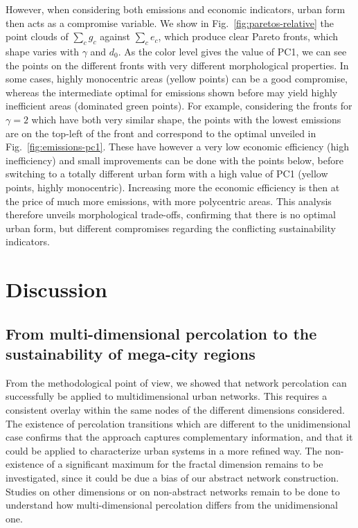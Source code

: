 \documentclass{jimis-en}
\begin{document}
However, when considering both emissions and economic indicators, urban form then acts as a compromise variable. We show in Fig.~\ref{fig:paretos-relative} the point clouds of $\sum_c g_c$ against $\sum_c e_c$, which produce clear Pareto fronts, which shape varies with $\gamma$ and $d_0$. As the color level gives the value of PC1, we can see the points on the different fronts with very different morphological properties. In some cases, highly monocentric areas (yellow points) can be a good compromise, whereas the intermediate optimal for emissions shown before may yield highly inefficient areas (dominated green points). For example, considering the fronts for $\gamma = 2$ which have both very similar shape, the points with the lowest emissions are on the top-left of the front and correspond to the optimal unveiled in Fig.~\ref{fig:emissions-pc1}. These have however a very low economic efficiency (high inefficiency) and small improvements can be done with the points below, before switching to a totally different urban form with a high value of PC1 (yellow points, highly monocentric). Increasing more the economic efficiency is then at the price of much more emissions, with more polycentric areas. This analysis therefore unveils morphological trade-offs, confirming that there is no optimal urban form, but different compromises regarding the conflicting sustainability indicators.



\section{Discussion}


\subsection{From multi-dimensional percolation to the sustainability of mega-city regions}

From the methodological point of view, we showed that network percolation can successfully be applied to multidimensional urban networks. This requires a consistent overlay within the same nodes of the different dimensions considered. The existence of percolation transitions which are different to the unidimensional case confirms that the approach captures complementary information, and that it could be applied to characterize urban systems in a more refined way. The non-existence of a significant maximum for the fractal dimension remains to be investigated, since it could be due a bias of our abstract network construction. Studies on other dimensions or on non-abstract networks remain to be done to understand how multi-dimensional percolation differs from the unidimensional one.
\end{document}
